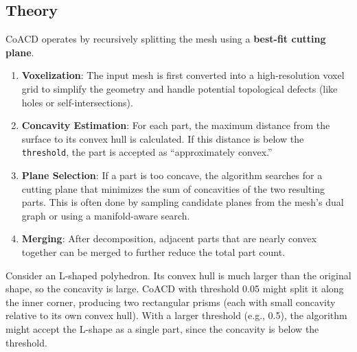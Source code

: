 \subsection{Theory}
CoACD operates by recursively splitting the mesh using a \textbf{best-fit cutting plane}\cite{wei2022}.
\begin{enumerate}
\item \textbf{Voxelization}: The input mesh is first converted into a high-resolution voxel grid to simplify the geometry and handle potential topological defects (like holes or self-intersections).
\item \textbf{Concavity Estimation}: For each part, the maximum distance from the surface to its convex hull is calculated. If this distance is below the \texttt{threshold}, the part is accepted as ``approximately convex.''
\item \textbf{Plane Selection}: If a part is too concave, the algorithm searches for a cutting plane that minimizes the sum of concavities of the two resulting parts. This is often done by sampling candidate planes from the mesh's dual graph or using a manifold-aware search.
\item \textbf{Merging}: After decomposition, adjacent parts that are nearly convex together can be merged to further reduce the total part count.
\end{enumerate}

\begin{example}\label{ex:coacd_lshape}
Consider an L-shaped polyhedron. Its convex hull is much larger than the original shape, so the concavity is large. CoACD with threshold 0.05 might split it along the inner corner, producing two rectangular prisms (each with small concavity relative to its own convex hull). With a larger threshold (e.g., 0.5), the algorithm might accept the L-shape as a single part, since the concavity is below the threshold.
\end{example}

